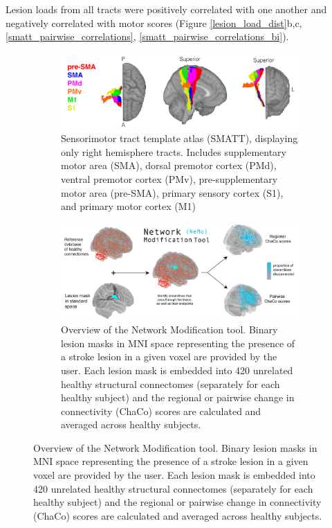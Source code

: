 \documentclass[10pt]{article}
\begin{document}
Lesion loads from all tracts were positively correlated with one another and negatively correlated with motor scores (Figure \ref{lesion_load_dist}b,c, \ref{smatt_pairwise_correlations}, \ref{smatt_pairwise_correlations_bi}). 

\begin{figure}
\begin{subfigure}{1\textwidth}
  \centering
  \includegraphics[width=1\linewidth]{figures/SMATT.png}
  \caption{Sensorimotor tract template atlas (SMATT), displaying only right hemisphere tracts. Includes supplementary motor area (SMA), dorsal premotor cortex (PMd), ventral premotor cortex (PMv), pre-supplementary motor area (pre-SMA), primary sensory cortex (S1),  and primary motor cortex (M1)}
  \label{smatt}
\end{subfigure}
\label{fig:fig}

\begin{subfigure}{1\textwidth}
  \centering
  \includegraphics[width=1\linewidth]{figures/NeMo.png}
  \caption{Overview of the Network Modification tool. Binary lesion masks in MNI space representing the presence of a stroke lesion in a given voxel are provided by the user. Each lesion mask is embedded into 420 unrelated healthy structural connectomes (separately for each healthy subject) and the regional or pairwise change in connectivity (ChaCo) scores are calculated and averaged across healthy subjects. }
  \label{nemo}
\end{subfigure}

\end{figure}
\end{document}
